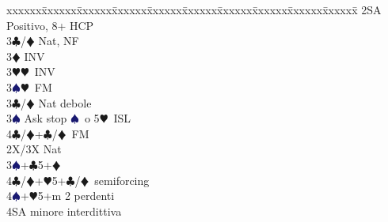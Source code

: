 \documentclass[a4paper,italian]{article}
\newcommand{\BC}{\textcolor{OliveGreen}{$\clubsuit$}}
\newcommand{\BD}{\textcolor{RedOrange}{$\vardiamondsuit$}}
\newcommand{\BH}{\textcolor{Red2}{$\varheartsuit${}}}
\newcommand{\BS}{\textcolor{MidnightBlue}{$\spadesuit${}}}
\newenvironment{bidtable}
{\begin{tabbing}

    xxxxxx\=xxxxxx\=xxxxxx\=xxxxxx\=xxxxxx\=xxxxxx\=xxxxxx\=xxxxxx\=xxxxxx\=xxxxxx\=\kill}
{\end{tabbing} }%
\begin{document}
\begin{multicols}{2}
\begin{bidtable}
                                            2SA\> Positivo, 8+ HCP\+\\
                                            3\BC/\BD \> Nat, NF\+\\
                                            3\BD\> INV\\
                                            3\BH{}\BH\ INV\\
                                            3\BS{}\BH\ FM\-\-\\
                                            3\BC/\BD\> Nat debole\\
                                            3\BS\> Ask stop \BS\ o 5\BH\ ISL\\
                                            4\BC/\BD{}+\BC/\BD\ FM\-\\
                                            2X/3X\> Nat\\
                                            3\BS{}+\BC5+\BD\\
                                            4\BC/\BD{}+\BH5+\BC/\BD\ semiforcing\\
                                            4\BS{}+\BH5+m 2 perdenti\\
                                            4SA minore interdittiva
                                        \end{bidtable}

\end{multicols}
\end{document}
